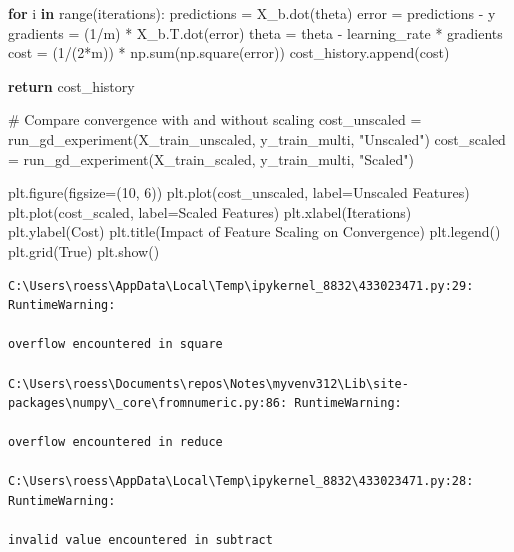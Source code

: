 \documentclass[
  letterpaper,
  DIV=11,
  numbers=noendperiod]{scrreprt}
\newenvironment{Shaded}{\begin{snugshade}}{\end{snugshade}}
\newcommand{\BuiltInTok}[1]{\textcolor[rgb]{0.00,0.23,0.31}{#1}}
\newcommand{\CommentTok}[1]{\textcolor[rgb]{0.37,0.37,0.37}{#1}}
\newcommand{\ControlFlowTok}[1]{\textcolor[rgb]{0.00,0.23,0.31}{\textbf{#1}}}
\newcommand{\DecValTok}[1]{\textcolor[rgb]{0.68,0.00,0.00}{#1}}
\newcommand{\KeywordTok}[1]{\textcolor[rgb]{0.00,0.23,0.31}{\textbf{#1}}}
\newcommand{\NormalTok}[1]{\textcolor[rgb]{0.00,0.23,0.31}{#1}}
\newcommand{\OperatorTok}[1]{\textcolor[rgb]{0.37,0.37,0.37}{#1}}
\newcommand{\StringTok}[1]{\textcolor[rgb]{0.13,0.47,0.30}{#1}}
\newcommand{\VariableTok}[1]{\textcolor[rgb]{0.07,0.07,0.07}{#1}}
\begin{document}
\begin{Shaded}
\begin{Highlighting}[]
    \ControlFlowTok{for}\NormalTok{ i }\KeywordTok{in} \BuiltInTok{range}\NormalTok{(iterations):}
\NormalTok{        predictions }\OperatorTok{=}\NormalTok{ X\_b.dot(theta)}
\NormalTok{        error }\OperatorTok{=}\NormalTok{ predictions }\OperatorTok{{-}}\NormalTok{ y}
\NormalTok{        gradients }\OperatorTok{=}\NormalTok{ (}\DecValTok{1}\OperatorTok{/}\NormalTok{m) }\OperatorTok{*}\NormalTok{ X\_b.T.dot(error)}
\NormalTok{        theta }\OperatorTok{=}\NormalTok{ theta }\OperatorTok{{-}}\NormalTok{ learning\_rate }\OperatorTok{*}\NormalTok{ gradients}
\NormalTok{        cost }\OperatorTok{=}\NormalTok{ (}\DecValTok{1}\OperatorTok{/}\NormalTok{(}\DecValTok{2}\OperatorTok{*}\NormalTok{m)) }\OperatorTok{*}\NormalTok{ np.}\BuiltInTok{sum}\NormalTok{(np.square(error))}
\NormalTok{        cost\_history.append(cost)}
    
    \ControlFlowTok{return}\NormalTok{ cost\_history}

\CommentTok{\# Compare convergence with and without scaling}
\NormalTok{cost\_unscaled }\OperatorTok{=}\NormalTok{ run\_gd\_experiment(X\_train\_unscaled, y\_train\_multi, }\StringTok{"Unscaled"}\NormalTok{)}
\NormalTok{cost\_scaled }\OperatorTok{=}\NormalTok{ run\_gd\_experiment(X\_train\_scaled, y\_train\_multi, }\StringTok{"Scaled"}\NormalTok{)}

\NormalTok{plt.figure(figsize}\OperatorTok{=}\NormalTok{(}\DecValTok{10}\NormalTok{, }\DecValTok{6}\NormalTok{))}
\NormalTok{plt.plot(cost\_unscaled, label}\OperatorTok{=}\StringTok{\textquotesingle{}Unscaled Features\textquotesingle{}}\NormalTok{)}
\NormalTok{plt.plot(cost\_scaled, label}\OperatorTok{=}\StringTok{\textquotesingle{}Scaled Features\textquotesingle{}}\NormalTok{)}
\NormalTok{plt.xlabel(}\StringTok{\textquotesingle{}Iterations\textquotesingle{}}\NormalTok{)}
\NormalTok{plt.ylabel(}\StringTok{\textquotesingle{}Cost\textquotesingle{}}\NormalTok{)}
\NormalTok{plt.title(}\StringTok{\textquotesingle{}Impact of Feature Scaling on Convergence\textquotesingle{}}\NormalTok{)}
\NormalTok{plt.legend()}
\NormalTok{plt.grid(}\VariableTok{True}\NormalTok{)}
\NormalTok{plt.show()}
\end{Highlighting}
\end{Shaded}

\begin{verbatim}
C:\Users\roess\AppData\Local\Temp\ipykernel_8832\433023471.py:29: RuntimeWarning:

overflow encountered in square

C:\Users\roess\Documents\repos\Notes\myvenv312\Lib\site-packages\numpy\_core\fromnumeric.py:86: RuntimeWarning:

overflow encountered in reduce

C:\Users\roess\AppData\Local\Temp\ipykernel_8832\433023471.py:28: RuntimeWarning:

invalid value encountered in subtract
\end{verbatim}
\end{document}
